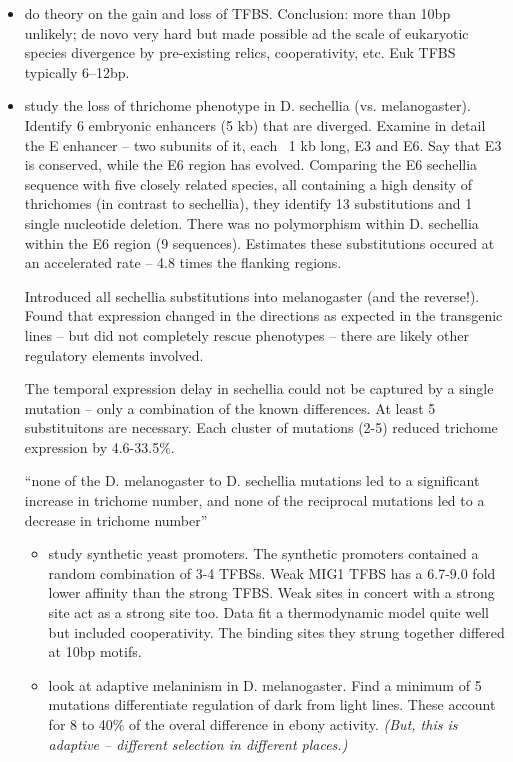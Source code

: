 \documentclass{article}
\begin{document}
\begin{itemize}
    \item \citet{tugrul2015dynamics} do theory on the gain and loss of TFBS.  
        Conclusion: more than 10bp unlikely; de novo very hard but made possible ad the scale of eukaryotic species divergence by pre-existing relics, cooperativity, etc.
        Euk TFBS typically 6--12bp.


  \item \citet{frankel2011morphological} study the loss of thrichome phenotype in D. sechellia (vs. melanogaster). Identify 6 embryonic enhancers (5 kb) that are diverged. Examine in detail the E enhancer -- two subunits of it, each ~1 kb long, E3 and E6. Say that E3 is conserved, while the E6 region has evolved. Comparing the E6 sechellia sequence with five closely related species, all containing a high density of thrichomes (in contrast to sechellia), they identify 13 substitutions and 1 single nucleotide deletion. There was no polymorphism within D. sechellia within the E6 region (9 sequences). Estimates these substitutions occured at an accelerated rate -- 4.8 times the flanking regions. 

    Introduced all sechellia substitutions into melanogaster (and the reverse!). Found that expression changed in the directions as expected in the transgenic lines -- but did not completely rescue phenotypes -- there are likely other regulatory elements involved. 

    The temporal expression delay in sechellia could not be captured by a single mutation -- only a combination of the known differences. At least 5 substituitons are necessary. Each cluster of mutations (2-5) reduced trichome expression by 4.6-33.5\%. 


    ``none of the D. melanogaster to D. sechellia mutations led to a significant increase in trichome number, and none of the reciprocal mutations led to a decrease in trichome number''

    \begin{itemize}
      \item \citet{gertz2009analysis} study synthetic yeast promoters. The synthetic promoters contained a random combination of 3-4 TFBSs. Weak MIG1 TFBS has a 6.7-9.0 fold lower affinity than the strong TFBS. Weak sites in concert with a strong site act as a strong site too.  Data fit a thermodynamic model quite well but included cooperativity.  The binding sites they strung together differed at 10bp motifs.


  \item \citet{rebeiz2009stepwise} look at adaptive melaninism in D. melanogaster. 
      Find a minimum of 5 mutations differentiate regulation of dark from light lines. These account for 8 to 40\% of the overal difference in ebony activity.  \emph{(But, this is adaptive -- different selection in different places.)}


\end{itemize}
\end{itemize}
\end{document}
